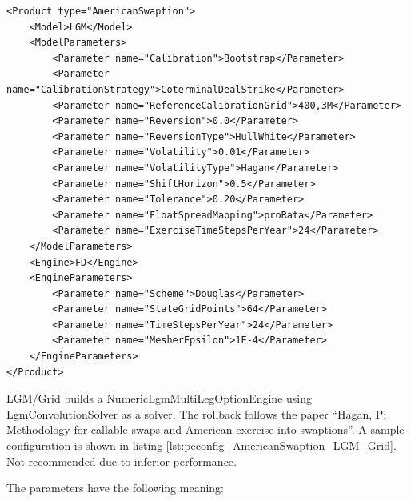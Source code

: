 \begin{longlisting}
\begin{verbatim}
<Product type="AmericanSwaption">
    <Model>LGM</Model>
    <ModelParameters>
        <Parameter name="Calibration">Bootstrap</Parameter>
        <Parameter name="CalibrationStrategy">CoterminalDealStrike</Parameter>
        <Parameter name="ReferenceCalibrationGrid">400,3M</Parameter>
        <Parameter name="Reversion">0.0</Parameter>
        <Parameter name="ReversionType">HullWhite</Parameter>
        <Parameter name="Volatility">0.01</Parameter>
        <Parameter name="VolatilityType">Hagan</Parameter>
        <Parameter name="ShiftHorizon">0.5</Parameter>
        <Parameter name="Tolerance">0.20</Parameter>
        <Parameter name="FloatSpreadMapping">proRata</Parameter>
        <Parameter name="ExerciseTimeStepsPerYear">24</Parameter>
    </ModelParameters>
    <Engine>FD</Engine>
    <EngineParameters>
        <Parameter name="Scheme">Douglas</Parameter>
        <Parameter name="StateGridPoints">64</Parameter>
        <Parameter name="TimeStepsPerYear">24</Parameter>
        <Parameter name="MesherEpsilon">1E-4</Parameter>
    </EngineParameters>
</Product>
\end{verbatim}
\caption{Configuration for Product AmericanSwaption, Model LGM, Engine FD}
\label{lst:peconfig_AmericanSwaption_LGM_FD}
\end{longlisting}

LGM/Grid builds a NumericLgmMultiLegOptionEngine using LgmConvolutionSolver as a solver. The rollback follows the paper
``Hagan, P: Methodology for callable swaps and American exercise into swaptions''. A sample configuration is shown in
listing \ref{lst:peconfig_AmericanSwaption_LGM_Grid}. Not recommended due to inferior performance.

The parameters have the following meaning:


